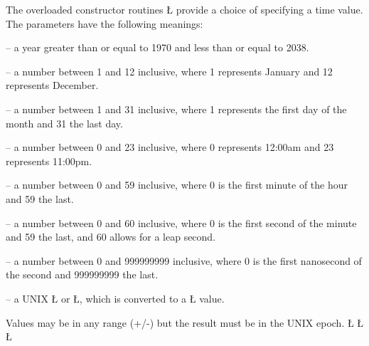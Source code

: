 \documentclass[openright,twoside]{report}
\begin{document}
The overloaded constructor routines \LGinlinetrue\LGbegin\lgrinde\L{}\endlgrinde\LGend{} provide a choice of specifying a time value.
The parameters have the following meanings:
\begin{prefix}
\item[\LGinlinetrue\LGbegin\lgrinde\L{\LB{\V{year}}}\endlgrinde\LGend{}] -- a year greater than or equal to 1970 and less than or equal to 2038.
\item[\LGinlinetrue\LGbegin\lgrinde\L{\LB{\V{month}}}\endlgrinde\LGend{}] -- a number between 1 and 12 inclusive, where 1 represents January and 12 represents December.
\item[\LGinlinetrue\LGbegin\lgrinde\L{\LB{\V{day}}}\endlgrinde\LGend{}] -- a number between 1 and 31 inclusive, where 1 represents the first day of the month and 31 the last day.
\item[\LGinlinetrue\LGbegin\lgrinde\L{\LB{\V{hour}}}\endlgrinde\LGend{}] -- a number between 0 and 23 inclusive, where 0 represents 12:00am and 23 represents 11:00pm.
\item[\LGinlinetrue\LGbegin\lgrinde\L{\LB{\V{min}}}\endlgrinde\LGend{}] -- a number between 0 and 59 inclusive, where 0 is the first minute of the hour and 59 the last.
\item[\LGinlinetrue\LGbegin\lgrinde\L{\LB{\V{sec}}}\endlgrinde\LGend{}] -- a number between 0 and 60 inclusive, where 0 is the first second of the minute and 59 the last, and 60 allows for a leap second.
\item[\LGinlinetrue\LGbegin\lgrinde\L{\LB{\V{nsec}}}\endlgrinde\LGend{}] -- a number between 0 and 999999999 inclusive, where 0 is the first nanosecond of the second and 999999999 the last.
\item[\LGinlinetrue\LGbegin\lgrinde\L{\LB{\V{timeval}}}\endlgrinde\LGend{} / \LGinlinetrue\LGbegin\lgrinde\L{\LB{\V{timespec}}}\endlgrinde\LGend{}] -- a UNIX \LGinlinetrue\LGbegin\lgrinde\L{}\endlgrinde\LGend{} or \LGinlinetrue\LGbegin\lgrinde\L{}\endlgrinde\LGend{}, which is converted to a \LGinlinetrue\LGbegin\lgrinde\L{}\endlgrinde\LGend{} value.
\end{prefix}
Values may be in any range (+/-) but the result must be in the UNIX epoch.
\LGinlinefalse\LGbegin\lgrinde
\L{}
\CE{}\L{}
\CE{}\L{}
\CE{}\endlgrinde\LGend
\end{document}

